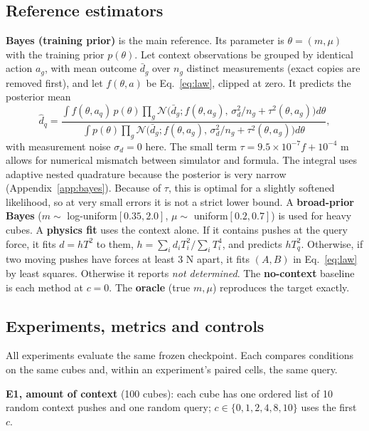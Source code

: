 \documentclass{article}
\begin{document}
\subsection{Reference estimators}\label{sec:refs}
\textbf{Bayes (training prior)} is the main reference. Its parameter is $\theta=(m,\mu)$ with the training prior $p(\theta)$. Let context observations be grouped by identical action $a_g$, with mean outcome $\bar d_g$ over $n_g$ distinct measurements (exact copies are removed first), and let $f(\theta,a)$ be Eq.~\eqref{eq:law}, clipped at zero. It predicts the posterior mean
\begin{equation}
\hat d_q=\frac{\int f(\theta,a_q)\,p(\theta)\prod_g\mathcal N\!\big(\bar d_g;f(\theta,a_g),\,\sigma_d^2/n_g+\tau^2(\theta,a_g)\big)d\theta}{\int p(\theta)\prod_g\mathcal N\!\big(\bar d_g;f(\theta,a_g),\,\sigma_d^2/n_g+\tau^2(\theta,a_g)\big)d\theta},
\label{eq:bayes}
\end{equation}
with measurement noise $\sigma_d=0$ here. The small term $\tau=9.5\times10^{-7}f+10^{-4}$ m allows for numerical mismatch between simulator and formula. The integral uses adaptive nested quadrature because the posterior is very narrow (Appendix~\ref{app:bayes}). Because of $\tau$, this is optimal for a slightly softened likelihood, so at very small errors it is not a strict lower bound. A \textbf{broad-prior Bayes} ($m\sim$ log-uniform$[0.35,2.0]$, $\mu\sim$ uniform$[0.2,0.7]$) is used for heavy cubes. A \textbf{physics fit} uses the context alone. If it contains pushes at the query force, it fits $d=hT^2$ to them, $h=\sum_i d_iT_i^2/\sum_i T_i^4$, and predicts $hT_q^2$. Otherwise, if two moving pushes have forces at least 3 N apart, it fits $(A,B)$ in Eq.~\eqref{eq:law} by least squares. Otherwise it reports \emph{not determined}. The \textbf{no-context} baseline is each method at $c=0$. The \textbf{oracle} (true $m,\mu$) reproduces the target exactly.

\subsection{Experiments, metrics and controls}\label{sec:exps}
All experiments evaluate the same frozen checkpoint. Each compares conditions on the same cubes and, within an experiment's paired cells, the same query.

\textbf{E1, amount of context} (100 cubes): each cube has one ordered list of 10 random context pushes and one random query; $c\in\{0,1,2,4,8,10\}$ uses the first $c$.
\end{document}
